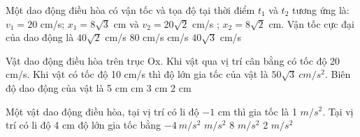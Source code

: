 \begin{vidu}%
Một dao động điều hòa có vận tốc và tọa độ tại thời điểm $t_1$ và $t_2$ tương ứng là: $v_1 = 20$ cm/s; $x_1 = 8\sqrt{3}$ cm và $v_{2} = 20\sqrt{2}$ cm/s ; $x_2 = 8\sqrt{2}$ cm. Vận tốc cực đại của dao động là
\choice
{$40\sqrt{2}$ cm/s}
{80 cm/s}
{ cm/s}
{$40\sqrt{3}$ cm/s}
\end{vidu} %
\begin{vidu}%
Vật dao động điều hòa trên trục Ox. Khi vật qua vị trí cân bằng có tốc độ 20 cm/s. Khi vật có tốc độ 10 cm/s thì độ lớn gia tốc của vật là $50\sqrt{3}\ cm/s^2$. Biên độ dao động của vật là
\choice
{5 cm}
{ cm}
{3 cm}
{2 cm}
\end{vidu} %
\begin{vidu}%
Một vật dao động điều hòa, tại vị trí có li độ $- 1$ cm thì gia tốc là 1 $m/s^2$. Tại vị trí có li độ 4 cm độ lớn gia tốc bằng
\choice
{$- 4\ m/s^2$}
{ $m/s^2$}
{8 $m/s^2$}
{2 $m/s^2$}
\end{vidu} %
